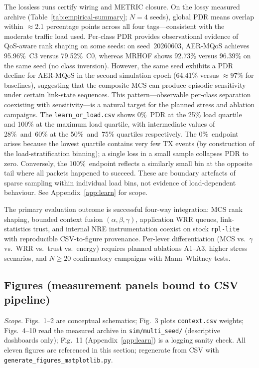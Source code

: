 The lossless runs certify wiring and METRIC closure. On the lossy measured archive (Table~\ref{tab:empirical-summary}; $N{=}4$ seeds), global PDR means overlap within $\approx$2.1 percentage points across all four tags---consistent with the moderate traffic load used. Per-class PDR provides observational evidence of QoS-aware rank shaping on some seeds: on seed~20260603, AER-MQoS achieves 95.96\%~C3 versus 79.52\%~C0, whereas MRHOF shows 92.73\% versus 96.39\% on the same seed (no class inversion). However, the same seed exhibits a PDR decline for AER-MQoS in the second simulation epoch (64.41\% versus $\approx$97\% for baselines), suggesting that the composite MCS can produce episodic sensitivity under certain link-state sequences. This pattern---observable per-class separation coexisting with sensitivity---is a natural target for the planned stress and ablation campaigns. The \texttt{learn\_or\_load.csv} shows 0\%~PDR at the 25\% load quartile and 100\% at the maximum load quartile, with intermediate values of 28\%~and~60\% at the 50\%~and~75\% quartiles respectively. The 0\%~endpoint arises because the lowest quartile contains very few TX events (by construction of the load-stratification binning); a single loss in a small sample collapses PDR to zero. Conversely, the 100\%~endpoint reflects a similarly small bin at the opposite tail where all packets happened to succeed. These are boundary artefacts of sparse sampling within individual load bins, not evidence of load-dependent behaviour. See Appendix~\ref{app:learn} for scope.

The primary evaluation outcome is successful four-way integration: MCS rank shaping, bounded context fusion $(\alpha,\beta,\gamma)$, application WRR queues, link-statistics trust, and internal NRE instrumentation coexist on stock \texttt{rpl-lite} with reproducible CSV-to-figure provenance. Per-lever differentiation (MCS vs.\ $\gamma$ vs.\ WRR vs.\ trust vs.\ energy) requires planned ablations A1--A3, higher stress scenarios, and $N{\geq}20$ confirmatory campaigns with Mann--Whitney tests.

\subsection{Figures (measurement panels bound to CSV pipeline)}
\label{sec:eval-figures-scope}
\noindent\textit{Scope.} Figs.~1--2 are conceptual schematics; Fig.~3 plots \texttt{context.csv} weights; Figs.~4--10 read the measured archive in \texttt{sim/multi\_seed/} (descriptive dashboards only); Fig.~11 (Appendix~\ref{app:learn}) is a logging sanity check. All eleven figures are referenced in this section; regenerate from CSV with \texttt{generate\_figures\_matplotlib.py}.

